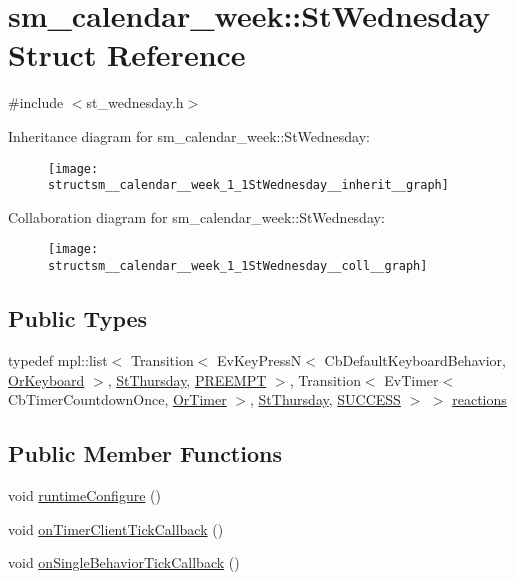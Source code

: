 \hypertarget{structsm__calendar__week_1_1StWednesday}{}\section{sm\+\_\+calendar\+\_\+week\+:\+:St\+Wednesday Struct Reference}
\label{structsm__calendar__week_1_1StWednesday}


{\ttfamily \#include $<$st\+\_\+wednesday.\+h$>$}



Inheritance diagram for sm\+\_\+calendar\+\_\+week\+:\+:St\+Wednesday\+:
\nopagebreak
\begin{figure}[H]
\begin{center}
\leavevmode
\texttt{[image: structsm\_\_calendar\_\_week\_1\_1StWednesday\_\_inherit\_\_graph]}
\end{center}
\end{figure}


Collaboration diagram for sm\+\_\+calendar\+\_\+week\+:\+:St\+Wednesday\+:
\nopagebreak
\begin{figure}[H]
\begin{center}
\leavevmode
\texttt{[image: structsm\_\_calendar\_\_week\_1\_1StWednesday\_\_coll\_\_graph]}
\end{center}
\end{figure}
\subsection*{Public Types}
\begin{DoxyCompactItemize}
\item 
typedef mpl\+::list$<$ Transition$<$ Ev\+Key\+PressN$<$ Cb\+Default\+Keyboard\+Behavior, \hyperlink{classsm__calendar__week_1_1OrKeyboard}{Or\+Keyboard} $>$, \hyperlink{structsm__calendar__week_1_1StThursday}{St\+Thursday}, \hyperlink{classPREEMPT}{P\+R\+E\+E\+M\+PT} $>$, Transition$<$ Ev\+Timer$<$ Cb\+Timer\+Countdown\+Once, \hyperlink{classsm__calendar__week_1_1OrTimer}{Or\+Timer} $>$, \hyperlink{structsm__calendar__week_1_1StThursday}{St\+Thursday}, \hyperlink{classSUCCESS}{S\+U\+C\+C\+E\+SS} $>$ $>$ \hyperlink{structsm__calendar__week_1_1StWednesday_aa21e502e00fa09b841f8693bdb05e86d}{reactions}
\end{DoxyCompactItemize}
\subsection*{Public Member Functions}
\begin{DoxyCompactItemize}
\item 
void \hyperlink{structsm__calendar__week_1_1StWednesday_a5f47539c7bdbfaa8c808b5045e95444c}{runtime\+Configure} ()
\item 
void \hyperlink{structsm__calendar__week_1_1StWednesday_a1ee9efe65b63cb472eaaf7c49f072ebc}{on\+Timer\+Client\+Tick\+Callback} ()
\item 
void \hyperlink{structsm__calendar__week_1_1StWednesday_ac7c04230cbb805c53a779f2fa2ca213b}{on\+Single\+Behavior\+Tick\+Callback} ()
\end{DoxyCompactItemize}
